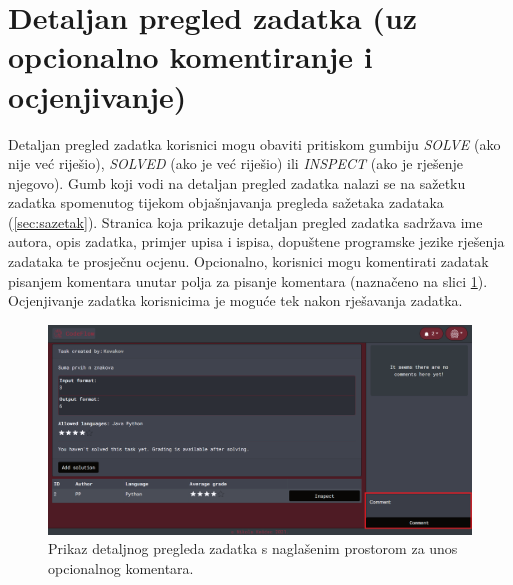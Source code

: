 \documentclass[times, utf8, zavrsni, numeric]{fer}
\begin{document}
		\section{Detaljan pregled zadatka (uz opcionalno komentiranje i ocjenjivanje)}
		Detaljan pregled zadatka korisnici mogu obaviti pritiskom gumbiju \textit{SOLVE} (ako nije već riješio), \textit{SOLVED} (ako je već riješio) ili \textit{INSPECT} (ako je rješenje njegovo). Gumb koji vodi na detaljan pregled zadatka nalazi se na sažetku zadatka spomenutog tijekom objašnjavanja pregleda sažetaka zadataka (\ref{sec:sazetak}). Stranica koja prikazuje detaljan pregled zadatka sadržava ime autora, opis zadatka, primjer upisa i ispisa, dopuštene programske jezike rješenja zadataka te prosječnu ocjenu. Opcionalno, korisnici mogu komentirati zadatak pisanjem komentara unutar polja za pisanje komentara (naznačeno na slici \ref{fig:detaljanpregled}). Ocjenjivanje zadatka korisnicima je moguće tek nakon rješavanja zadatka.
		\begin{figure}[H]
			\centering
			\includegraphics[width=\linewidth]{pictures/koristenje/DetaljanPregledZadatka.png}
			\caption{Prikaz detaljnog pregleda zadatka s naglašenim prostorom za unos opcionalnog komentara.}
			\label{fig:detaljanpregled}
		\end{figure}
	
\end{document}
